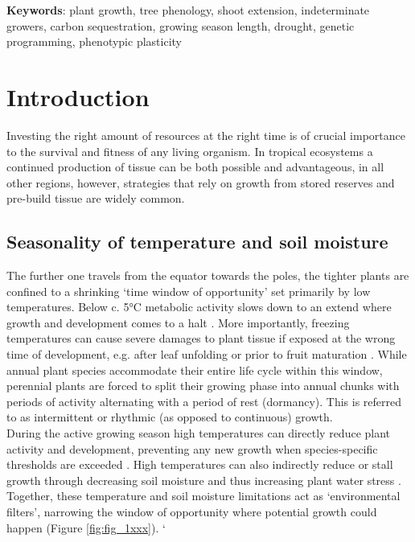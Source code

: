 \documentclass{article}
\begin{document}
			\textbf{Keywords}: plant growth, tree phenology, shoot extension, indeterminate growers, carbon sequestration, growing season length, drought, genetic programming, phenotypic plasticity
			\newpage
			
\section*{Introduction}
		Investing the right amount of resources at the right time is of crucial importance to the survival and fitness of any living organism. In tropical ecosystems a continued production of tissue can be both possible and advantageous, in all other regions, however, strategies that rely on growth from stored reserves and pre-build tissue are widely common. 

	\subsection*{Seasonality of temperature and soil moisture}
		The further one travels from the equator towards the poles, the tighter plants are confined to a shrinking ‘time window of opportunity’ set primarily by low temperatures. Below c. 5°C  metabolic activity slows down to an extend where growth and development comes to a halt \citep{schenkerPhysiologicalMinimumTemperatures2014, rossiCriticalTemperaturesXylogenesis2008, kornerWinterCropGrowth2008}. More importantly, freezing temperatures can cause severe damages to plant tissue if exposed at the wrong time of development, e.g. after leaf unfolding or prior to fruit maturation \citep{sakaiFreezingInjuriesPlants1987c, baumgartenNoRiskNo2023a}. 
		While annual plant species accommodate their entire life cycle within this window, perennial plants are forced to split their growing phase into annual chunks with periods of activity alternating with a period of rest (dormancy). This is referred to as intermittent or rhythmic (as opposed to continuous) growth. \\

		During the active growing season high temperatures can directly reduce plant activity and development, preventing any new growth when species-specific thresholds are exceeded \citep{osullivanThermalLimitsLeaf2017}. High temperatures can also indirectly reduce or stall growth through decreasing soil moisture and thus increasing plant water stress \citep{hsiaoPlantResponsesWater1973, pugnaireConstraintsWaterStress1999, etzoldNumberGrowthDays2021}. Together, these temperature and soil moisture limitations act as `environmental filters', narrowing the window of opportunity where potential growth could happen (Figure \ref{fig:fig_1xxx}).
		`
\end{document}
